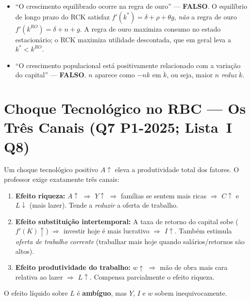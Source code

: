 \documentclass[12pt, a4paper]{article}
\begin{document}
\begin{armbox}[title={Armadilha recorrente (Q3/Q4)}]
\begin{itemize}[leftmargin=*]
  \item ``O crescimento equilibrado ocorre na regra de ouro'' — \textbf{FALSO}. O equilíbrio de longo prazo do RCK satisfaz $f'(k^*) = \delta+\rho+\theta g$, \emph{não} a regra de ouro $f'(k^{RO}) = \delta+n+g$. A regra de ouro maximiza consumo no estado estacionário; o RCK maximiza utilidade descontada, que em geral leva a $k^* < k^{RO}$.
  \item ``O crescimento populacional está positivamente relacionado com a variação do capital'' — \textbf{FALSO}. $n$ aparece como $-nk$ em $\dot k$, ou seja, maior $n$ \emph{reduz} $\dot k$.
\end{itemize}
\end{armbox}

\section{Choque Tecnológico no RBC — Os Três Canais (Q7 P1-2025; Lista~I Q8)}

Um choque tecnológico positivo $A\uparrow$ eleva a produtividade total dos fatores. O professor exige exatamente três canais:

\begin{fatorbox}[title={Os três efeitos de um choque tecnológico positivo}]
\begin{enumerate}[leftmargin=*, label=\textbf{\Alph*.}]
  \item \textbf{Efeito riqueza:} $A\uparrow$ $\Rightarrow$ $Y\uparrow$ $\Rightarrow$ famílias se sentem mais ricas $\Rightarrow$ $C\uparrow$ e $L\downarrow$ (mais lazer). Tende a \emph{reduzir} a oferta de trabalho.
  \item \textbf{Efeito substituição intertemporal:} A taxa de retorno do capital sobe ($f'(K)\uparrow$) $\Rightarrow$ investir hoje é mais lucrativo $\Rightarrow$ $I\uparrow$. Também estimula \emph{oferta de trabalho corrente} (trabalhar mais hoje quando salários/retornos são altos).
  \item \textbf{Efeito produtividade do trabalho:} $w\uparrow$ $\Rightarrow$ mão de obra mais cara relativa ao lazer $\Rightarrow$ $L\uparrow$. Compensa parcialmente o efeito riqueza.
\end{enumerate}
O efeito líquido sobre $L$ é \textbf{ambíguo}, mas $Y$, $I$ e $w$ sobem inequivocamente.
\end{fatorbox}
\end{document}
